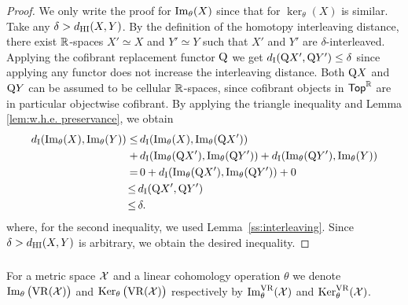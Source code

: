 \begin{proof}
	We only write the proof for $\operatorname{Im}_\theta(X)$ since that for $\ker_\theta(X)$ is similar.
	Take any $\delta > d_{\mathrm{HI}}(X,Y)$.
	By the definition of the homotopy interleaving distance, there exist $\mathbb{R}$-spaces $X' \simeq X$ and $Y' \simeq Y$ such that $X'$ and $Y'$ are $\delta$-interleaved.
	Applying the cofibrant replacement functor $\mathrm{Q}$ we get $d_{\mathrm{I}}(\mathrm{Q} X', \mathrm{Q} Y') \leq \delta$ since applying any functor does not increase the interleaving distance.
	Both $\mathrm{Q} X$ and $\mathrm{Q} Y$ can be assumed to be cellular $\mathbb{R}$-spaces, since cofibrant objects in $\mathsf{Top}^{\mathbb{R}}$ are in particular objectwise cofibrant.
	By applying the triangle inequality and Lemma \ref{lem:w.h.e. preservance}, we obtain
	\begin{align*}
		d_{\mathrm{I}}(\operatorname{Im}_\theta(X), \operatorname{Im}_\theta(Y)) \leq& \,
		d_{\mathrm{I}}(\operatorname{Im}_\theta(X), \operatorname{Im}_\theta(\mathrm{Q} X')) \\ +& \,
		d_{\mathrm{I}}(\operatorname{Im}_\theta(\mathrm{Q} X'), \operatorname{Im}_\theta(\mathrm{Q} Y')) + d_{\mathrm{I}}(\operatorname{Im}_\theta(\mathrm{Q} Y'), \operatorname{Im}_\theta(Y)) \\ =& \,
		0 + d_{\mathrm{I}}(\operatorname{Im}_\theta(\mathrm{Q} X'), \operatorname{Im}_\theta(\mathrm{Q} Y')) + 0 \\ \leq \,&
		d_{\mathrm{I}}(\mathrm{Q} X', \mathrm{Q} Y') \\ \leq \,&
		\delta.
	\end{align*}
	where, for the second inequality, we used Lemma~\ref{ss:interleaving}.
	Since $\delta > d_{\mathrm{HI}}(X,Y)$ is arbitrary, we obtain the desired inequality.
\end{proof}

\subsubsection{}\label{cor:theta stability VR}

For a metric space \(\mathcal{X}\) and a linear cohomology operation \(\theta\) we denote \(\operatorname{Im}_\theta\big(\mathrm{VR}(\mathcal{X})\big)\) and \(\operatorname{Ker}_\theta\big(\mathrm{VR}(\mathcal{X})\big)\) respectively by \(\operatorname{Im}_\theta^{\mathrm{VR}}(\mathcal{X})\) and \(\operatorname{Ker}_\theta^{\mathrm{VR}}(\mathcal{X})\).

